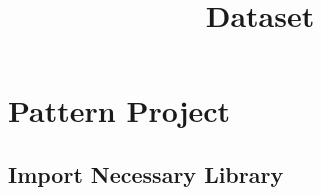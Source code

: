 \documentclass[11pt]{article}
\title{Dataset}
\begin{document}
    
    
    \maketitle
    
    

    
    \hypertarget{pattern-project}{%
\section{Pattern Project}\label{pattern-project}}

    \hypertarget{import-necessary-library}{%
\subsection{Import Necessary Library}\label{import-necessary-library}}
\end{document}
